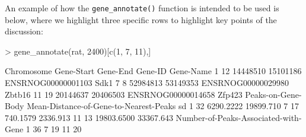 \documentclass[12pt]{article}
\begin{document}
An example of how the \texttt{gene\_annotate()} function is intended to be used is below, where we highlight three specific rows to highlight key points of the discussion:

\begin{Schunk}
\begin{Sinput}
> gene_annotate(rat, 2400)[c(1, 7, 11),]
\end{Sinput}
\begin{Soutput}
   Chromosome Gene-Start Gene-End            Gene-ID Gene-Name
1          12   14448510 15101186 ENSRNOG00000001103      Sdk1
7           8   52984813 53149353 ENSRNOG00000029980    Zbtb16
11         19   20144637 20406503 ENSRNOG00000014658    Zfp423
   Peaks-on-Gene-Body Mean-Distance-of-Gene-to-Nearest-Peaks        sd
1                  32                              6290.2222 19899.710
7                  17                               740.1579  2336.913
11                 13                             19803.6500 33367.643
   Number-of-Peaks-Associated-with-Gene
1                                    36
7                                    19
11                                   20
\end{Soutput}
\end{Schunk}
\end{document}
